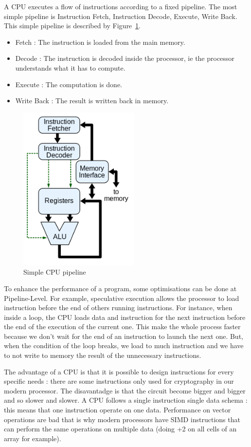 A \ac{CPU} executes a flow of instructions according to a fixed pipeline. The most simple pipeline is Instruction Fetch, Instruction Decode, Execute, Write Back. This simple pipeline is described by Figure~\ref{fig:Pipeline}.
\begin{itemize}
\item Fetch : The instruction is loaded from the main memory.
\item Decode : The instruction is decoded inside the processor, ie the processor understands what it has to compute.
\item Execute : The computation is done.
\item Write Back : The result is written back in memory.
\end{itemize}

\begin{figure}
\centering
\includegraphics[width=6cm]{gfx/Parallelism/Pipeline.png}
\caption{Simple \ac{CPU} pipeline}
\label{fig:Pipeline}
\end{figure}

To enhance the performance of a program, some optimisations can be done at Pipeline-Level. For example, speculative execution allows the processor to load instruction before the end of others running instructions. For instance, when inside a loop, the \ac{CPU} loads data and instruction for the next instruction before the end of the execution of the current one. This make the whole process faster because we don't wait for the end of an instruction to launch the next one. But, when the condition of the loop breaks, we load to much instruction and we have to not write to memory the result of the unnecessary instructions.

The advantage of a \ac{CPU} is that it is possible to design instructions for every specific needs : there are some instructions only used for cryptography in our modern processor. The disavantadge is that the circuit become bigger and bigger and so slower and slower. A \ac{CPU} follows a single instruction single data  schema : this means that one instruction operate on one data. Performance on vector operations are bad that is why modern processors have \ac{SIMD} instructions that can perform the same operations on multiple data (doing +2 on all cells of an array for example).

